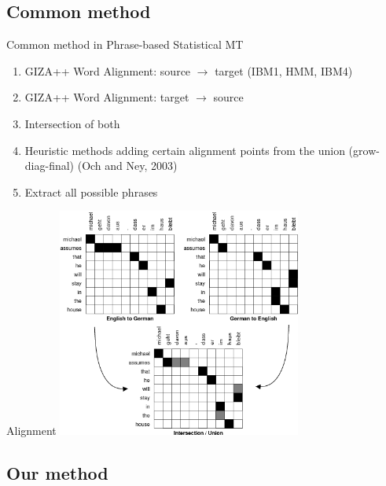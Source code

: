 \documentclass[compress]{beamer}
\begin{document}
\subsection{Common method}

\begin{frame}
	\begin{block}{Common method in Phrase-based Statistical MT}
		\begin{enumerate}
			\item GIZA++ Word Alignment: source $\rightarrow$ target (IBM1, HMM, IBM4)
			\item GIZA++ Word Alignment: target $\rightarrow$ source
			\item Intersection of both
			\item Heuristic methods adding certain alignment points from the union (grow-diag-final) (Och and Ney, 2003)
			\item Extract all possible phrases
		\end{enumerate}
	\end{block}

\end{frame}


\begin{frame}{Alignment}
	 \includegraphics[width=80.0mm]{growdiagfinal.png}
\end{frame}

\subsection{Our method}
\end{document}
